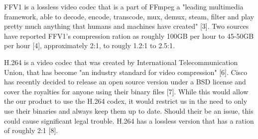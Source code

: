 \documentclass[letterpaper,10pt,onecolumn,draftclsnofoot]{IEEEtran}
\begin{document}
FFV1 is a lossless video codec that is a part of FFmpeg a "leading multimedia framework, able to decode, encode, transcode, mux, demux, steam, filter and play pretty much anything that humans and machines have created" [3].
Two sources have reported FFV1's compression ration as roughly 100GB per hour to 45-50GB per hour [4], approximately 2:1, to rougly 1.2:1 to 2.5:1.

H.264 is a video codec that was created by International Telecommunication Union, that has become "an industry standard for video compression" [6].
Cisco has recently decided to release an open source version under a BSD license and cover the royalties for anyone using their binary files [7].
While this would allow the our product to use the H.264 codex, it would restrict us in the need to only use their binaries and always keep them up to date.
Should their be an issue, this could cause significant legal trouble.
H.264 has a lossless version that has a ration of roughly 2:1 [8].



\end{document}
